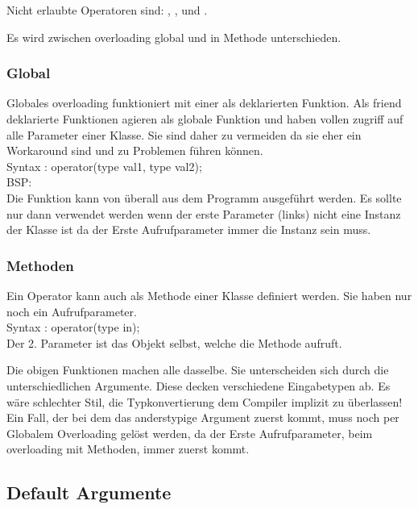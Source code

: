 Nicht erlaubte Operatoren sind: , , \say{::} und .

Es wird zwischen overloading global und in Methode unterschieden.

\subsubsection{Global}

Globales overloading funktioniert mit einer als  deklarierten Funktion. 
Als friend deklarierte Funktionen agieren als globale Funktion und haben vollen zugriff auf alle Parameter einer Klasse. 
Sie sind daher zu vermeiden da sie eher ein Workaround sind und zu Problemen führen können.\\ 

Syntax :  operator(type val1, type val2);\\
BSP:\\



Die Funktion kann von überall aus dem Programm ausgeführt werden. 
Es sollte nur dann verwendet werden wenn der erste Parameter (links) nicht eine Instanz der Klasse ist da der Erste Aufrufparameter immer die Instanz sein muss.  

\subsubsection{Methoden}

Ein Operator kann auch als Methode einer Klasse definiert werden. 
Sie haben nur noch ein Aufrufparameter.\\
Syntax :  operator(type in);\\
Der 2. Parameter ist das Objekt selbst, welche die Methode aufruft.



Die obigen Funktionen machen alle dasselbe. 
Sie unterscheiden sich durch die unterschiedlichen Argumente. 
Diese decken verschiedene Eingabetypen ab. 
Es wäre schlechter Stil, die Typkonvertierung dem Compiler implizit zu überlassen! 
Ein Fall, der bei dem das anderstypige Argument zuerst kommt, muss noch per Globalem Overloading gelöst werden, da der Erste Aufrufparameter, beim overloading mit Methoden, immer zuerst kommt. 
 
\subsection{Default Argumente}

